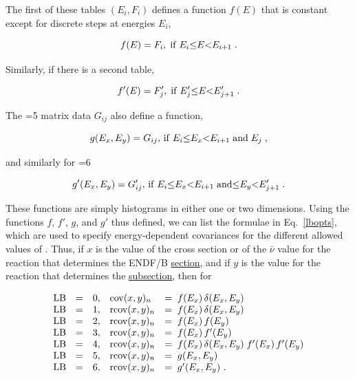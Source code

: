 The first of these tables $(E_i,F_i)$ defines a function $f(E)$
that is constant except for
discrete steps at energies $E_i$,

\begin{equation}
f(E) = F_i ,\;{\rm if}\; E_i{\leq} E{<}E_{i+1} \;.
\label{e12}
\end{equation}
\vspace{0.5 pt}

\noindent
Similarly, if there is a second table,

\begin{equation}
f'(E) = F'_j , \; {\rm if}\; E'_j{\leq}E{<}E'_{j+1} \;.
\end{equation}
\vspace{0.5 pt}

\noindent
The =5 matrix data $G_{ij}$ also define a function,

\begin{equation}
g(E_x,E_y) = G_{ij},\, {\rm{if}}\; E_i {\leq} E_x{<}E_{i+1} \;{\rm {and}}\; E_j
\; , \end{equation}

\noindent
and similarly for =6

\begin{equation}
g'(E_x,E_y) = G'_{ij}, \, {\rm {if}}\;  E_i  {\leq} E_x {<} E_{i+1}\;{\rm {and}}
{\leq} E_y{<}E'_{j+1} \;.
\end{equation}
\vspace{1 pt}

\noindent
These functions are simply histograms in either one or two dimensions.
Using the functions $f$, $f'$, $g$, and $g'$ thus defined, we can list
the formulae in Eq.~\ref{lbopts}, which are used to specify energy-dependent
covariances for the different allowed values of .  Thus, if
$x$ is the value of the cross section or of the $\bar{\nu}$ value for the
reaction  that determines the ENDF/B
\underline{section}, and if $y$ is the value for the reaction
 that determines the \underline{subsection}, then for

\begin{equation}
\begin{array} {rrrll}
{\rm {LB}} & = & 0, &  {\rm {{\rm cov}}} (x,y)_n   & = \; f (E_x) \,
  \delta (E_x,E_y)   \\
{\rm {LB}} & = & 1, &  {\rm {r{\rm cov}}} (x,y)_n  & =  \; f (E_x) \,
  \delta (E_x,E_y)  \\
{\rm {LB}} & = & 2, &  {\rm {r{\rm cov}}} (x,y)_n  & =  \; f (E_x)\,f(E_y)  \\
{\rm {LB}} & = & 3, &  {\rm {r{\rm cov}}} (x,y)_n  & =  \;f (E_x)\,f'(E_y) \\
{\rm {LB}} & = & 4, &  {\rm {r{\rm cov}}} (x,y)_n  & = \; f (E_x) \,
  \delta (E_x,E_y)\;f'(E_x)\,f'(E_y)
\\ {\rm {LB}} & = & 5, &  {\rm {r{\rm cov}}} (x,y)_n  & =  \;g (E_x,E_y)  \\
{\rm {LB}} & = & 6, &  {\rm {r{\rm cov}}} (x,y)_n  & = \; g'(E_x,E_y)\,\,.
\end{array}
\label{lbopts}
\end{equation}

